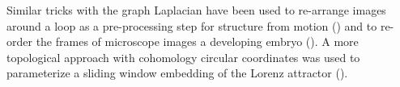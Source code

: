 \documentclass{article}
\begin{document}
Similar tricks with the graph Laplacian have been used to re-arrange images around a loop as a pre-processing step for structure from motion (\cite{averbuch2015ringit}) and to re-order the frames of microscope images a developing embryo (\cite{dsilva2015diffusionvecordering}).  A more topological approach with cohomology circular coordinates was used to parameterize a sliding window embedding of the Lorenz attractor (\cite{de2012topological}).



\end{document}
